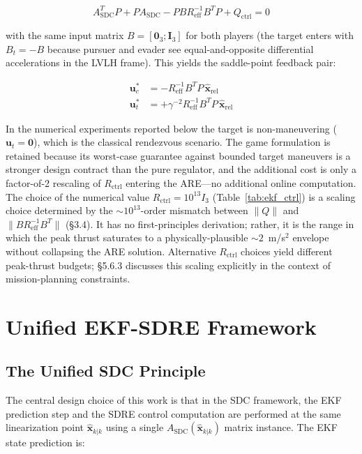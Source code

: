 \documentclass[preprint,3p,times]{elsarticle}
\begin{document}
\begin{equation}
A_{\text{SDC}}^T P + P A_{\text{SDC}} - P B R_{\text{eff}}^{-1} B^T P + Q_{\text{ctrl}} = 0 \label{eq:are}
\end{equation}

with the same input matrix $B = [\mathbf{0}_3; \mathbf{I}_3]$ for both players (the target enters with $B_t = -B$ because pursuer and evader see equal-and-opposite differential accelerations in the LVLH frame). This yields the saddle-point feedback pair:

\begin{align}
\mathbf{u}_c^* &= -R_{\text{eff}}^{-1} B^T P \,\hat{\mathbf{x}}_{\text{rel}} \label{eq:uc_opt} \\
\mathbf{u}_t^* &= +\gamma^{-2} R_{\text{eff}}^{-1} B^T P \,\hat{\mathbf{x}}_{\text{rel}}
\end{align}

In the numerical experiments reported below the target is non-maneuvering ($\mathbf{u}_t = \mathbf{0}$), which is the classical rendezvous scenario. The game formulation is retained because its worst-case guarantee against bounded target maneuvers is a stronger design contract than the pure regulator, and the additional cost is only a factor-of-2 rescaling of $R_{\text{ctrl}}$ entering the ARE---no additional online computation. The choice of the numerical value $R_{\text{ctrl}} = 10^{13} I_3$ (Table~\ref{tab:ekf_ctrl}) is a scaling choice determined by the ${\sim}10^{13}$-order mismatch between $\|Q\|$ and $\|B R_{\text{eff}}^{-1} B^T\|$ (§3.4). It has no first-principles derivation; rather, it is the range in which the peak thrust saturates to a physically-plausible ${\sim}2$~m/s$^2$ envelope without collapsing the ARE solution. Alternative $R_{\text{ctrl}}$ choices yield different peak-thrust budgets; §5.6.3 discusses this scaling explicitly in the context of mission-planning constraints.

\section{Unified EKF-SDRE Framework}

\subsection{The Unified SDC Principle}

The central design choice of this work is that in the SDC framework, the EKF prediction step and the SDRE control computation are performed at the same linearization point $\hat{\mathbf{x}}_{k|k}$ using a single $A_{\text{SDC}}(\hat{\mathbf{x}}_{k|k})$ matrix instance. The EKF state prediction is:
\end{document}
